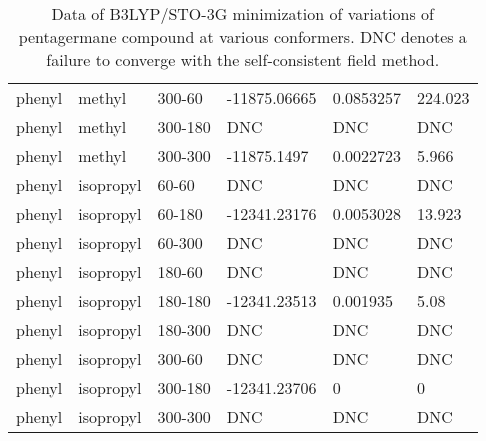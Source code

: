 \begin{table}[]
\begin{tabular}{llllll}
		phenyl & methyl & 300-60 & -11875.06665 & 0.0853257 & 224.023 \\
		phenyl & methyl & 300-180 & DNC & DNC & DNC \\
		phenyl & methyl & 300-300 & -11875.1497 & 0.0022723 & 5.966 \\ \hline
		phenyl & isopropyl & 60-60 & DNC & DNC & DNC \\
		phenyl & isopropyl & 60-180 & -12341.23176 & 0.0053028 & 13.923 \\
		phenyl & isopropyl & 60-300 & DNC & DNC & DNC \\
		phenyl & isopropyl & 180-60 & DNC & DNC & DNC \\
		phenyl & isopropyl & 180-180 & -12341.23513 & 0.001935 & 5.08 \\
		phenyl & isopropyl & 180-300 & DNC & DNC & DNC \\
		phenyl & isopropyl & 300-60 & DNC & DNC & DNC \\
		phenyl & isopropyl & 300-180 & -12341.23706 & 0 & 0 \\
		phenyl & isopropyl & 300-300 & DNC & DNC & DNC
	\end{tabular}
	\caption{Data of B3LYP/STO-3G minimization of variations of pentagermane compound at various conformers. DNC denotes a failure to converge with the self-consistent field method.}
	\label{tab:Ge5Ver2Data}
\end{table}

